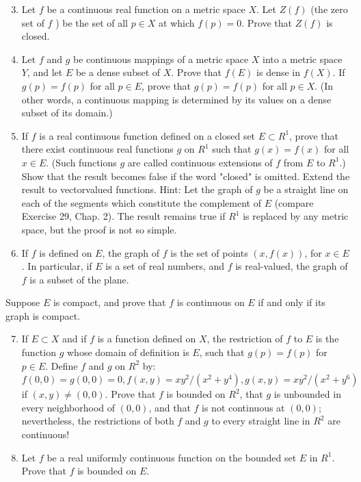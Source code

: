 \documentclass[10pt]{article}
\begin{document}
\begin{enumerate}
  \setcounter{enumi}{2}
  \item Let $f$ be a continuous real function on a metric space $X$. Let $Z(f)$ (the zero set of $f$ ) be the set of all $p \in X$ at which $f(p)=0$. Prove that $Z(f)$ is closed.

  \item Let $f$ and $g$ be continuous mappings of a metric space $X$ into a metric space $Y$, and let $E$ be a dense subset of $X$. Prove that $f(E)$ is dense in $f(X)$. If $g(p)=f(p)$ for all $p \in E$, prove that $g(p)=f(p)$ for all $p \in X$. (In other words, a continuous mapping is determined by its values on a dense subset of its domain.)

  \item If $f$ is a real continuous function defined on a closed set $E \subset R^{1}$, prove that there exist continuous real functions $g$ on $R^{1}$ such that $g(x)=f(x)$ for all $x \in E$. (Such functions $g$ are called continuous extensions of $f$ from $E$ to $R^{1}$.) Show that the result becomes false if the word "closed" is omitted. Extend the result to vectorvalued functions. Hint: Let the graph of $g$ be a straight line on each of the segments which constitute the complement of $E$ (compare Exercise 29, Chap. 2). The result remains true if $R^{1}$ is replaced by any metric space, but the proof is not so simple.

  \item If $f$ is defined on $E$, the graph of $f$ is the set of points $(x, f(x))$, for $x \in E$. In particular, if $E$ is a set of real numbers, and $f$ is real-valued, the graph of $f$ is a subset of the plane.

\end{enumerate}

Suppose $E$ is compact, and prove that $f$ is continuous on $E$ if and only if its graph is compact.

\begin{enumerate}
  \setcounter{enumi}{6}
  \item If $E \subset X$ and if $f$ is a function defined on $X$, the restriction of $f$ to $E$ is the function $g$ whose domain of definition is $E$, such that $g(p)=f(p)$ for $p \in E$. Define $f$ and $g$ on $R^{2}$ by: $f(0,0)=g(0,0)=0, f(x, y)=x y^{2} /\left(x^{2}+y^{4}\right), g(x, y)=x y^{2} /\left(x^{2}+y^{6}\right)$ if $(x, y) \neq(0,0)$. Prove that $f$ is bounded on $R^{2}$, that $g$ is unbounded in every neighborhood of $(0,0)$, and that $f$ is not continuous at $(0,0)$; nevertheless, the restrictions of both $f$ and $g$ to every straight line in $R^{2}$ are continuous!

  \item Let $f$ be a real uniformly continuous function on the bounded set $E$ in $R^{1}$. Prove that $f$ is bounded on $E$.

\end{enumerate}
\end{document}
